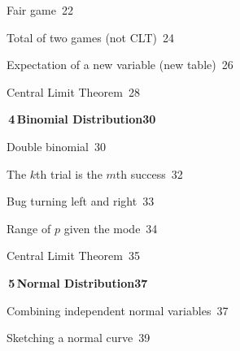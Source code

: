{\noindent{}\quad Fair game\dotfill\ 22\par
\noindent{}\quad Total of two games (not CLT)\dotfill\ 24\par
\noindent{}\quad Expectation of a new variable (new table)\dotfill\ 26\par
\noindent{}\quad Central Limit Theorem\dotfill\ 28\par
\medskip\noindent\colorbox{blue!8}{\parbox{\dimexpr\textwidth-2\fboxsep}{\large\bfseries\color{blue!50!black}\colorbox{blue!50!black}{\color{white}\,4\,}\quad Binomial Distribution\hfill 30}}\par\nopagebreak\smallskip\nopagebreak
\noindent{}\quad Double binomial\dotfill\ 30\par
\noindent{}\quad The $k$th trial is the $m$th success\dotfill\ 32\par
\noindent{}\quad Bug turning left and right\dotfill\ 33\par
\noindent{}\quad Range of $p$ given the mode\dotfill\ 34\par
\noindent{}\quad Central Limit Theorem\dotfill\ 35\par
\medskip\noindent\colorbox{blue!8}{\parbox{\dimexpr\textwidth-2\fboxsep}{\large\bfseries\color{blue!50!black}\colorbox{blue!50!black}{\color{white}\,5\,}\quad Normal Distribution\hfill 37}}\par\nopagebreak\smallskip\nopagebreak
\noindent{}\quad Combining independent normal variables\dotfill\ 37\par
\noindent{}\quad Sketching a normal curve\dotfill\ 39\par
}
